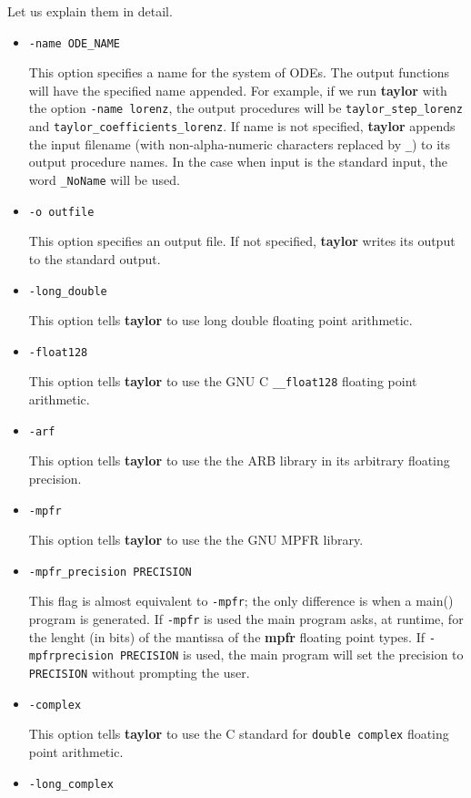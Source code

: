 \documentclass[10pt]{article}
\theoremstyle{remark}
\newcommand{\taylorname}{{\bf taylor}}
\begin{document}
Let us explain them in detail.
\begin{itemize}
\item {
{ \verb+-name ODE_NAME+ 

This option specifies a name for the system of ODEs. The output
functions will have the specified name appended. For example, if we
run \taylorname{} with the option \verb+-name lorenz+, the output
procedures will be \verb+taylor_step_lorenz+ and
\verb+taylor_coefficients_lorenz+.  If name is not specified,
\taylorname{} appends the input filename (with non-alpha-numeric
characters replaced by \verb+_+) to its output procedure names. In the
case when input is the standard input, the word \verb+_NoName+ will be
used.}  }
\item {
{ \verb+-o outfile+ 

This option specifies an output file. If not specified, \taylorname{}
writes its output to the standard output.}

}
\item {
{\verb+-long_double+

This option tells \taylorname{} to use long double
floating point arithmetic.  }
}
\item {
{\verb+-float128+

This option tells \taylorname{} to use the GNU C \verb+__float128+
floating point arithmetic.  }
}
\item {
{\verb+-arf+ 

This option tells \taylorname{} to use the the ARB library in its
arbitrary floating precision.}}
\item {
{\verb+-mpfr+ 

This option tells \taylorname{} to use the the GNU MPFR library.  }
}
\item {
{\verb+-mpfr_precision PRECISION+

This flag is almost equivalent to {\tt -mpfr}; the only difference is
when a main() program is generated. If {\tt -mpfr} is used the main
program asks, at runtime, for the lenght (in bits) of the mantissa of
the {\bf mpfr} floating point types. If {\tt -mpfrprecision
  PRECISION} is used, the main program will set the precision to {\tt
  PRECISION} without prompting the user.}

}
\item {
{\verb+-complex+

This option tells \taylorname{} to use the C standard for
\verb+double complex+ floating point arithmetic.  }
}
\item {
{\verb+-long_complex+

}}
\end{itemize}
\end{document}
